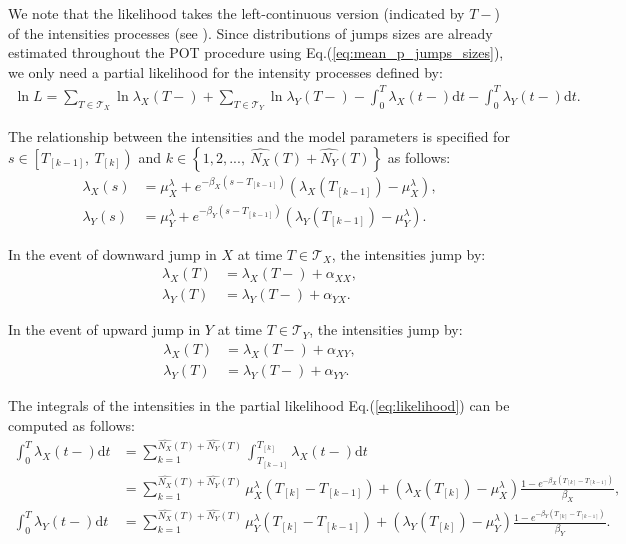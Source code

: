 \documentclass{article}
\newcommand{\diff}{\mathrm{d}}
\theoremstyle{definition}
\begin{document}
We note that the likelihood takes the left-continuous version (indicated by $T-$) of the intensities processes (see \citep[p. 232]{daley2003introduction}). Since distributions of jumps sizes are already estimated throughout the POT procedure using Eq.(\ref{eq:mean_p_jumps_sizes}), we only need a partial likelihood for the intensity processes defined by: 
\begin{align}
 \ln L = \sum_{T \in \mathcal{T}_X} \ln \lambda_X(T-)
 + 
  \sum_{T \in \mathcal{T}_Y} \ln \lambda_Y(T-)
 - \int_0^T \lambda_X(t-)\diff t
 - \int_0^T \lambda_Y(t-)\diff t. \label{eq:likelihood}
\end{align}

The relationship between the intensities and the model parameters is specified for $s \in \left[T_{[k-1]},\ T_{[k]}\right)$ and $k \in \left\{1,2,...,\ \widehat{N_X}(T)+\widehat{N_Y}(T)\right\}$ as follows:
\begin{align}
 \lambda_X(s) &= \mu_X^\lambda + e^{-\beta_X\left(s - T_{[k-1]}\right)}\left(\lambda_X(T_{[k-1]})-\mu_X^\lambda\right),\\
 \lambda_Y(s) &= \mu_Y^\lambda + e^{-\beta_Y\left(s - T_{[k-1]}\right)}\left(\lambda_Y(T_{[k-1]})-\mu_Y^\lambda\right).
\end{align}

In the event of downward jump in $X$ at time $T \in \mathcal{T}_X$, the intensities jump by:
\begin{equation}
   \begin{split}
 \lambda_X(T) &= \lambda_X(T-) + \alpha_{XX},\\
 \lambda_Y(T) &= \lambda_Y(T-) + \alpha_{YX}.
   \end{split}
\end{equation}

In the event of upward jump in $Y$ at time $T \in \mathcal{T}_Y$, the intensities jump by:
\begin{equation}
   \begin{split}
 \lambda_X(T) &= \lambda_X(T-) + \alpha_{XY},\\
 \lambda_Y(T) &= \lambda_Y(T-) + \alpha_{YY}.
   \end{split}
\end{equation}

The integrals of the intensities in the partial likelihood Eq.(\ref{eq:likelihood}) can be computed as follows:
\begin{equation}
   \begin{split}
 \int_0^T\lambda_X(t-)\diff t &= \sum_{k=1}^{\widehat{N_X}(T) + \widehat{N_Y}(T)} \int_{T_{[k-1]}}^{T_{[k]}}\lambda_X(t-)\diff t\\
 &= \sum_{k=1}^{\widehat{N_X}(T) + \widehat{N_Y}(T)} 
\mu_X^\lambda(T_{[k]}-T_{[k-1]})
+\left(\lambda_X(T_{[k]})-\mu_X^\lambda\right)\frac{1-e^{-\beta_X(T_{[k]} - T_{[k-1]})}}{\beta_X},\\ 
\int_0^T\lambda_Y(t-)\diff t&= \sum_{k=1}^{\widehat{N_X}(T) + \widehat{N_Y}(T)} 
\mu_Y^\lambda(T_{[k]}-T_{[k-1]})
+\left(\lambda_Y(T_{[k]})-\mu_Y^\lambda\right)\frac{1-e^{-\beta_Y(T_{[k]} - T_{[k-1]})}}{\beta_Y}.
   \end{split}
\end{equation}
\end{document}
